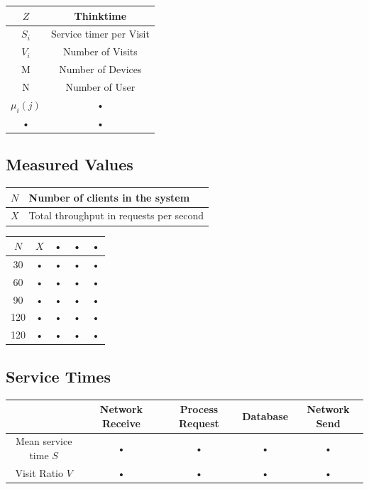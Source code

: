 \documentclass[a4paper]{article}
\begin{document}
\begin{tabular}{|c|c|}
\hline 
$Z$ & Thinktime \\ 
\hline 
$S_i$ & Service timer per Visit \\ 
\hline 
$V_i$ & Number of Visits \\ 
\hline 
M & Number of Devices \\ 
\hline 
N & Number of User \\ 
\hline 
$\mu_i(j)$ & • \\ 
\hline 
• & • \\ 
\hline 
\end{tabular} 



\subsection{Measured Values}

\begin{tabular}{|l|l|}
\hline 
$N$ & Number of clients in the system \\ 
\hline 
$X$ & Total throughput in requests per second \\ 
\hline 
\end{tabular} 

\begin{tabular}{|c|c|c|c|c|}
\hline 
$N$ & $X$ & • & • & • \\ 
\hline 
30 & • & • & • & • \\ 
\hline 
60 & • & • & • & • \\ 
\hline 
90 & • & • & • & • \\ 
\hline 
120 & • & • & • & • \\ 
\hline 
120 & • & • & • & • \\ 
\hline 
\end{tabular} 

\subsection{Service Times}

\begin{tabular}{|c|c|c|c|c|}
\hline 
  & Network Receive & Process Request & Database & Network Send \\ 
\hline 
Mean service time $S$ & • & • & • & • \\ 
\hline 
Visit Ratio $V$ & • & • & • & • \\ 

\hline 
\end{tabular} 
\end{document}
